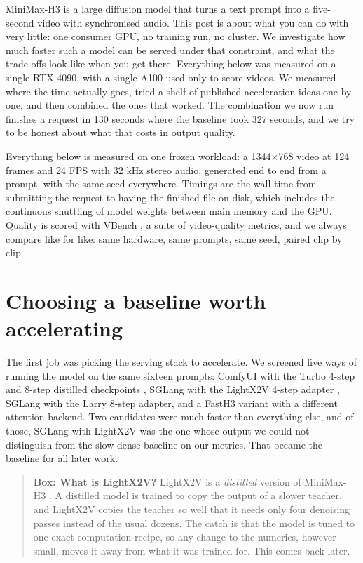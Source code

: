 MiniMax-H3 is a large diffusion model that turns a text prompt into a five-second video with synchronised audio. This post is about what you can do with very little: one consumer GPU, no training run, no cluster. We investigate how much faster such a model can be served under that constraint, and what the trade-offs look like when you get there. Everything below was measured on a single RTX 4090, with a single A100 used only to score videos. We measured where the time actually goes, tried a shelf of published acceleration ideas one by one, and then combined the ones that worked. The combination we now run finishes a request in 130 seconds where the baseline took 327 seconds, and we try to be honest about what that costs in output quality.

Everything below is measured on one frozen workload: a 1344$\times$768 video at 124 frames and 24 FPS with 32 kHz stereo audio, generated end to end from a prompt, with the same seed everywhere. Timings are the wall time from submitting the request to having the finished file on disk, which includes the continuous shuttling of model weights between main memory and the GPU. Quality is scored with VBench \citep{huang2024vbench}, a suite of video-quality metrics, and we always compare like for like: same hardware, same prompts, same seed, paired clip by clip.

\section{Choosing a baseline worth accelerating}

The first job was picking the serving stack to accelerate. We screened five ways of running the model on the same sixteen prompts: ComfyUI with the Turbo 4-step and 8-step distilled checkpoints \citep{comfyui}, SGLang \citep{zheng2024sglang} with the LightX2V 4-step adapter \citep{lightx2v}, SGLang with the Larry 8-step adapter, and a FastH3 variant with a different attention backend. Two candidates were much faster than everything else, and of those, SGLang with LightX2V was the one whose output we could not distinguish from the slow dense baseline on our metrics. That became the baseline for all later work.

\begin{quote}
\textbf{Box: What is LightX2V?} LightX2V \citep{lightx2v} is a \emph{distilled} version of MiniMax-H3 \citep{minimaxh3}. A distilled model is trained to copy the output of a slower teacher, and LightX2V copies the teacher so well that it needs only four denoising passes instead of the usual dozens. The catch is that the model is tuned to one exact computation recipe, so any change to the numerics, however small, moves it away from what it was trained for. This comes back later.
\end{quote}

